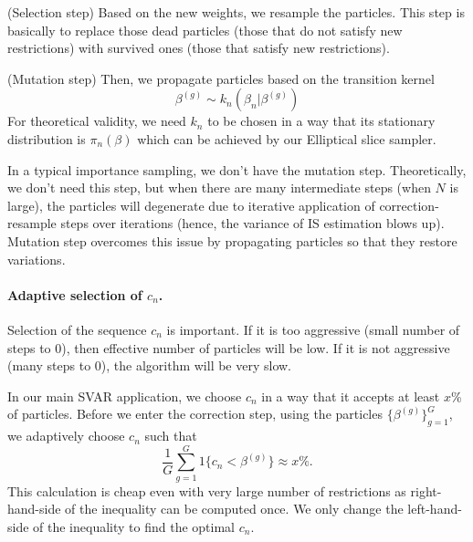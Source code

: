 \documentclass[11pt]{article}
\begin{document}
(Selection step) Based on the new weights, we resample the particles. This step is basically to replace those dead particles (those that do not satisfy new restrictions) with survived ones (those that satisfy new restrictions).

(Mutation step) Then, we propagate particles based on the transition kernel
\[
\beta^{(g)} \sim k_{n}(\beta_{n}|\beta^{(g)})
\]
For theoretical validity, we need $k_{n}$ to be chosen in a way that its stationary distribution is $\pi_{n}(\beta)$ which can be achieved by our Elliptical slice sampler. 

In a typical importance sampling, we don't have the mutation step. Theoretically, we don't need this step, but when there are many intermediate steps (when $N$ is large), the particles will degenerate due to iterative application of correction-resample steps over iterations (hence, the variance of IS estimation blows up). Mutation step overcomes this issue by propagating particles so that they restore variations. 

\paragraph{Adaptive selection of $c_{n}$.} Selection of the sequence $c_{n}$ is important. If it is too aggressive (small number of steps to 0), then effective number of particles will be low. If it is not aggressive (many steps to 0), the algorithm will be very slow.

In our main SVAR application, we choose $c_{n}$ in a way that it accepts at least $x$\% of particles. Before we enter the correction step, using the particles $\{\beta^{(g)}\}_{g=1}^{G}$, we adaptively choose $c_{n}$ such that 
\[
\frac{1}{G} \sum_{g=1}^{G} 1\{c_{n} < \beta^{(g)}\} \approx x \%.
\]
This calculation is cheap even with very large number of restrictions as right-hand-side of the inequality can be computed once. We only change the left-hand-side of the inequality to find the optimal $c_{n}$.
\end{document}
